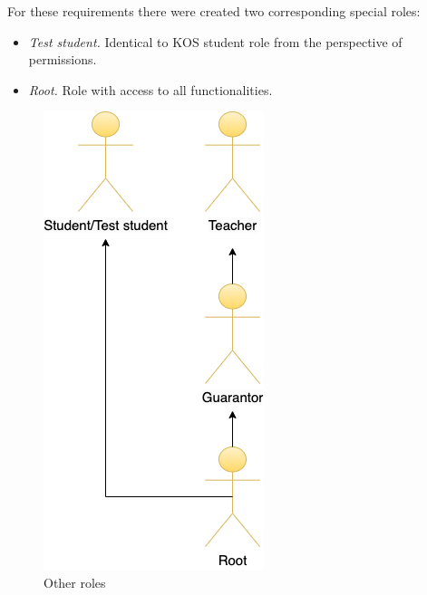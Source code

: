 \noindent For these requirements there were created two corresponding special roles:

\begin{itemize}
    \item \emph{Test student.} Identical to KOS student role from the perspective of permissions.
    \item \emph{Root.} Role with access to all functionalities.
\end{itemize}


\begin{figure}[h]
\centering
\includegraphics[scale=0.56]{../png/roles.png}
\caption{Other roles}\label{picture:special_roles}
\end{figure}
